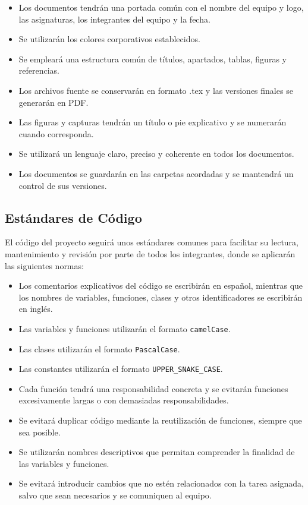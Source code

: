 \begin{itemize}
    \item Los documentos tendrán una portada común con el nombre del equipo y logo, las asignaturas, los integrantes del equipo y la fecha.
    \item Se utilizarán los colores corporativos establecidos.
    \item Se empleará una estructura común de títulos, apartados, tablas, figuras y referencias.
    \item Los archivos fuente se conservarán en formato .tex y las versiones finales se generarán en PDF.
    \item Las figuras y capturas tendrán un título o pie explicativo y se numerarán cuando corresponda.
    \item Se utilizará un lenguaje claro, preciso y coherente en todos los documentos.
    \item Los documentos se guardarán en las carpetas acordadas y se mantendrá un control de sus versiones.
\end{itemize}

\subsection{Estándares de Código}

El código del proyecto seguirá unos estándares comunes para facilitar su lectura, mantenimiento y revisión por parte de todos los integrantes, donde se aplicarán las siguientes normas:

\begin{itemize}
    \item Los comentarios explicativos del código se escribirán en español, mientras que los nombres de variables, funciones, clases y otros identificadores se escribirán en inglés.
    \item Las variables y funciones utilizarán el formato \texttt{camelCase}.
    \item Las clases utilizarán el formato \texttt{PascalCase}.
    \item Las constantes utilizarán el formato \texttt{UPPER\_SNAKE\_CASE}.
    \item Cada función tendrá una responsabilidad concreta y se evitarán funciones excesivamente largas o con demasiadas responsabilidades.
    \item Se evitará duplicar código mediante la reutilización de funciones, siempre que sea posible.
    \item Se utilizarán nombres descriptivos que permitan comprender la finalidad de las variables y funciones.
    \item Se evitará introducir cambios que no estén relacionados con la tarea asignada, salvo que sean necesarios y se comuniquen al equipo.
\end{itemize}

